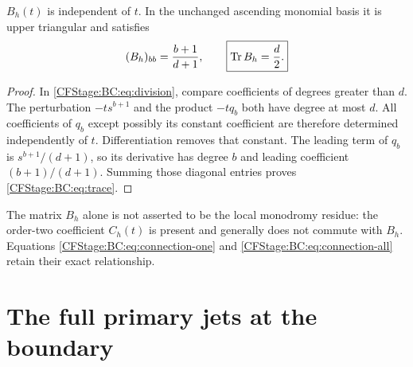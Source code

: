 \begin{proposition}
$B_h(t)$ is independent of $t$.  In the unchanged ascending monomial
basis it is upper triangular and satisfies
\begin{equation}
 (B_h)_{bb}=\frac{b+1}{d+1},\qquad
 \boxed{\operatorname{Tr} B_h=\frac d2.}
 \label{CFStage:BC:eq:trace}
\end{equation}
\end{proposition}
\begin{proof}
In \eqref{CFStage:BC:eq:division}, compare coefficients of degrees greater than
$d$.  The perturbation $-ts^{b+1}$ and the product $-tq_b$ both have
degree at most $d$.  All coefficients of $q_b$ except possibly its
constant coefficient are therefore determined independently of $t$.
Differentiation removes that constant.  The leading term of $q_b$ is
$s^{b+1}/(d+1)$, so its derivative has degree $b$ and leading coefficient
$(b+1)/(d+1)$.  Summing those diagonal entries proves
\eqref{CFStage:BC:eq:trace}.
\end{proof}

The matrix $B_h$ alone is not asserted to be the local monodromy
residue: the order-two coefficient $C_h(t)$ is present and generally
does not commute with $B_h$.  Equations \eqref{CFStage:BC:eq:connection-one} and
\eqref{CFStage:BC:eq:connection-all} retain their exact relationship.

\section{The full primary jets at the boundary}

